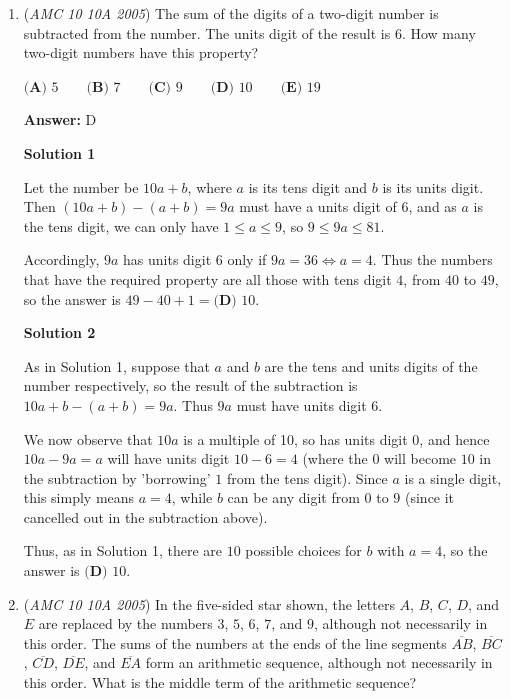 \begin{enumerate}
 and

 
 \[(3 \cdot 4) \cdot (3 \cdot 4) \cdot (2 \cdot 6) = 12^3.\]

 So we have $6$ possible cubes in total: $1^3$, $2^3$, $3^3$, $4^3$, $6^3$, and $12^3$, and the answer is $\boxed{\textbf{(E) } 6}$.

 


	\item (\textit{AMC 10 10A 2005}) The sum of the digits of a two-digit number is subtracted from the number. The units digit of the result is $6$. How many two-digit numbers have this property? 


 $\textbf{(A) } 5\qquad \textbf{(B) } 7\qquad \textbf{(C) } 9\qquad \textbf{(D) } 10\qquad \textbf{(E) } 19$

 \textbf{Answer: }D



\textbf{Solution 1}

Let the number be $10a+b$, where $a$ is its tens digit and $b$ is its units digit. Then $(10a+b)-(a+b) = 9a$ must have a units digit of $6$, and as $a$ is the tens digit, we can only have $1 \leq a \leq 9$, so $9 \leq 9a \leq 81$.

 Accordingly, $9a$ has units digit $6$ only if $9a = 36 \iff a=4$. Thus the numbers that have the required property are all those with tens digit $4$, from $40$ to $49$, so the answer is $49-40+1 = \boxed{\textbf{(D) } 10}$.

 



\textbf{Solution 2}

As in Solution 1, suppose that $a$ and $b$ are the tens and units digits of the number respectively, so the result of the subtraction is $10a+b-(a+b)=9a$. Thus $9a$ must have units digit $6$.

 We now observe that $10a$ is a multiple of 10, so has units digit $0$, and hence $10a-9a = a$ will have units digit $10-6 = 4$ (where the $0$ will become $10$ in the subtraction by 'borrowing' $1$ from the tens digit). Since $a$ is a single digit, this simply means $a = 4$, while $b$ can be any digit from $0$ to $9$ (since it cancelled out in the subtraction above).

 Thus, as in Solution 1, there are $10$ possible choices for $b$ with $a = 4$, so the answer is $\boxed{\textbf{(D) } 10}$.

 


	\item (\textit{AMC 10 10A 2005}) In the five-sided star shown, the letters $A$, $B$, $C$, $D$, and $E$ are replaced by the numbers $3$, $5$, $6$, $7$, and $9$, although not necessarily in this order. The sums of the numbers at the ends of the line segments $\overline{AB}$, $\overline{BC}$, $\overline{CD}$, $\overline{DE}$, and $\overline{EA}$ form an arithmetic sequence, although not necessarily in this order. What is the middle term of the arithmetic sequence? 



\end{enumerate}
